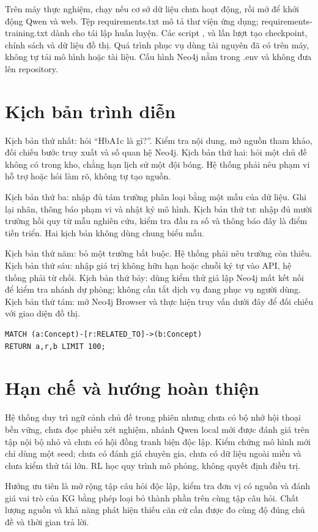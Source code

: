 Trên máy thực nghiệm, chạy  nếu cơ sở dữ liệu chưa hoạt động, rồi mở  để khởi động Qwen và web. Tệp requirements.txt mô tả thư viện ứng dụng; requirements-training.txt dành cho tái lập huấn luyện. Các script ,  và  lần lượt tạo checkpoint, chính sách và dữ liệu đồ thị. Quá trình phục vụ dùng tài nguyên đã có trên máy, không tự tải mô hình hoặc tài liệu. Cấu hình Neo4j nằm trong .env và không đưa lên repository.
\section{Kịch bản trình diễn}
Kịch bản thứ nhất: hỏi ``HbA1c là gì?''. Kiểm tra nội dung, mở nguồn tham khảo, đối chiếu bước truy xuất và số quan hệ Neo4j. Kịch bản thứ hai: hỏi một chủ đề không có trong kho, chẳng hạn lịch sử một đội bóng. Hệ thống phải nêu phạm vi hỗ trợ hoặc hỏi làm rõ, không tự tạo nguồn.

Kịch bản thứ ba: nhập đủ tám trường phân loại bằng một mẫu của dữ liệu. Ghi lại nhãn, thông báo phạm vi và nhật ký mô hình. Kịch bản thứ tư: nhập đủ mười trường hồi quy từ mẫu nghiên cứu, kiểm tra đầu ra số và thông báo đây là điểm tiến triển. Hai kịch bản không dùng chung biểu mẫu.

Kịch bản thứ năm: bỏ một trường bắt buộc. Hệ thống phải nêu trường còn thiếu. Kịch bản thứ sáu: nhập giá trị không hữu hạn hoặc chuỗi ký tự vào API, hệ thống phải từ chối. Kịch bản thứ bảy: dùng kiểm thử giả lập Neo4j mất kết nối để kiểm tra nhánh dự phòng; không cần tắt dịch vụ đang phục vụ người dùng. Kịch bản thứ tám: mở Neo4j Browser và thực hiện truy vấn dưới đây để đối chiếu với giao diện đồ thị.
\begin{verbatim}
MATCH (a:Concept)-[r:RELATED_TO]->(b:Concept)
RETURN a,r,b LIMIT 100;
\end{verbatim}
\section{Hạn chế và hướng hoàn thiện}
Hệ thống duy trì ngữ cảnh chủ đề trong phiên nhưng chưa có bộ nhớ hội thoại bền vững, chưa đọc phiếu xét nghiệm, nhánh Qwen local mới được đánh giá trên tập nội bộ nhỏ và chưa có hội đồng tranh biện độc lập. Kiểm chứng mô hình mới chỉ dùng một seed; chưa có đánh giá chuyên gia, chưa có dữ liệu ngoài miền và chưa kiểm thử tải lớn. RL học quy trình mô phỏng, không quyết định điều trị.

Hướng ưu tiên là mở rộng tập câu hỏi độc lập, kiểm tra đơn vị có nguồn và đánh giá vai trò của KG bằng phép loại bỏ thành phần trên cùng tập câu hỏi. Chất lượng nguồn và khả năng phát hiện thiếu căn cứ cần được đo cùng độ đúng chủ đề và thời gian trả lời.


